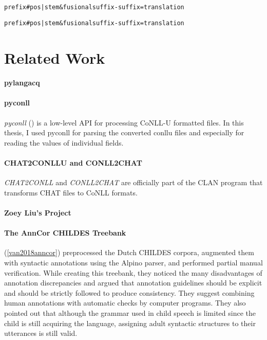 \texttt{prefix\#pos|stem\&fusionalsuffix-suffix=translation}


\texttt{prefix\#pos|stem\&fusionalsuffix-suffix=translation}


\section{Related Work}

\paragraph{pylangacq} %
\label{par:pylangacq}

\paragraph{pyconll} %
\label{par:pyconll}
\emph{pyconll} (\cite{pyconll}) is a low-level API for processing CoNLL-U formatted files. In this thesis, I used pyconll for parsing the converted conllu files and especially for reading the values of individual fields.

\paragraph{CHAT2CONLLU and CONLL2CHAT} %
\label{par:chat2conllu}
\emph{CHAT2CONLL} and \emph{CONLL2CHAT} are officially part of the CLAN program that transforms CHAT files to CoNLL formats.

\paragraph{Zoey Liu's Project} %
\label{par:zoey}

\paragraph{The AnnCor CHILDES Treebank}
(\ref{van2018anncor}) preprocessed the Dutch CHILDES corpora, augmented them with syntactic annotations using the Alpino parser, and performed partial manual verification. While creating this treebank, they noticed the many disadvantages of annotation discrepancies and argued that annotation guidelines should be explicit and should be strictly followed to produce consistency. They suggest combining human annotations with automatic checks by computer programs. They also pointed out that although the grammar used in child speech is limited since the child is still acquiring the language, assigning adult syntactic structures to their utterances is still valid.
